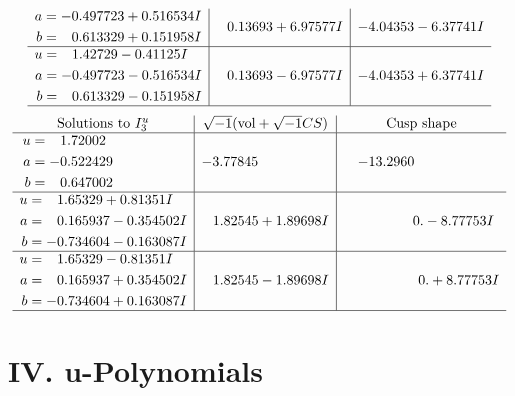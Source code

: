 \documentclass[1p]{elsarticle_modified}
\theoremstyle{definition}
\newcommand{\I}{\sqrt{-1}}
\begin{document}
$$\begin{array}{c|c|c}
\begin{aligned}
a &= -0.497723 + 0.516534 I \\
b &= \phantom{-}0.613329 + 0.151958 I\end{aligned}
 & \phantom{-}0.13693 + 6.97577 I & -4.04353 - 6.37741 I \\ \hline\begin{aligned}
u &= \phantom{-}1.42729 - 0.41125 I \\
a &= -0.497723 - 0.516534 I \\
b &= \phantom{-}0.613329 - 0.151958 I\end{aligned}
 & \phantom{-}0.13693 - 6.97577 I & -4.04353 + 6.37741 I\\
 \hline 
 \end{array}$$\newpage$$\begin{array}{c|c|c}  
\text{Solutions to }I^u_{3}& \I (\text{vol} + \sqrt{-1}CS) & \text{Cusp shape}\\
 \hline 
\begin{aligned}
u &= \phantom{-}1.72002\phantom{ +0.000000I} \\
a &= -0.522429\phantom{ +0.000000I} \\
b &= \phantom{-}0.647002\phantom{ +0.000000I}\end{aligned}
 & -3.77845\phantom{ +0.000000I} & -13.2960\phantom{ +0.000000I} \\ \hline\begin{aligned}
u &= \phantom{-}1.65329 + 0.81351 I \\
a &= \phantom{-}0.165937 - 0.354502 I \\
b &= -0.734604 - 0.163087 I\end{aligned}
 & \phantom{-}1.82545 + 1.89698 I & \phantom{-0.000000 } 0. - 8.77753 I \\ \hline\begin{aligned}
u &= \phantom{-}1.65329 - 0.81351 I \\
a &= \phantom{-}0.165937 + 0.354502 I \\
b &= -0.734604 + 0.163087 I\end{aligned}
 & \phantom{-}1.82545 - 1.89698 I & \phantom{-0.000000 -}0. + 8.77753 I\\
 \hline 
 \end{array}$$\newpage
\newpage\renewcommand{\arraystretch}{1}
\centering \section*{ IV. u-Polynomials}
\end{document}
